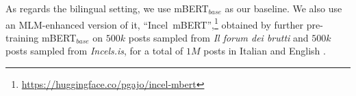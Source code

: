 \documentclass[11pt]{article}
\newcommand{\todoA}[1]{\todo[color=blue!40]{A: #1}}
\newcommand{\todoP}[1]{\todo[color=red]{P: #1}}
\newcommand{\mbert}{\mbox{mBERT$_{base}$}}
\newcommand{\imbert}{\mbox{Incel mBERT}}
\newcommand{\enforum}{\textit{Incels.is}}
\newcommand{\itforum}{\textit{Il forum dei brutti}}
\begin{document}
As regards the bilingual setting, we use \mbert{} as our baseline. We also use an MLM-enhanced version of it, ``\imbert'',\footnote{\url{https://huggingface.co/pgajo/incel-mbert}} obtained by further pre-training \mbert{} on $500k$ posts sampled from \itforum{} and $500k$ posts sampled from \enforum, for a total of $1M$ posts in Italian and English \cite{gajo2023identification}.

\end{document}
